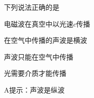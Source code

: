 下列说法正确的是\paren[A]
\begin{choices}
	\item 电磁波在真空中以光速\(c\)传播
	\item 在空气中传播的声波是横波
	\item 声波只能在空气中传播
	\item 光需要介质才能传播
\end{choices}
\begin{answer}
	A\quad 提示：声波是纵波
\end{answer}